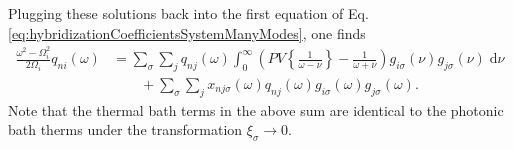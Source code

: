 Plugging these solutions back into the first equation of Eq. \eqref{eq:hybridizationCoefficientsSystemManyModes}, one finds
\begin{equation}
\begin{split}
\frac{\omega^2 - \Omega_i^2}{2\Omega_i}q_{ni}(\omega) &= \sum_\sigma\sum_jq_{nj}(\omega)\int_0^\infty\left(PV\left\{\frac{1}{\omega - \nu }\right\} - \frac{1}{\omega + \nu }\right)g_{i\sigma}(\nu)g_{j\sigma}(\nu)\;\mathrm{d}\nu\\
&\qquad + \sum_\sigma\sum_j x_{nj\sigma}(\omega)q_{nj}(\omega)g_{i\sigma}(\omega)g_{j\sigma}(\omega).
\end{split}
\end{equation}
Note that the thermal bath terms in the above sum are identical to the photonic bath therms under the transformation $\xi_\sigma\to0$.

